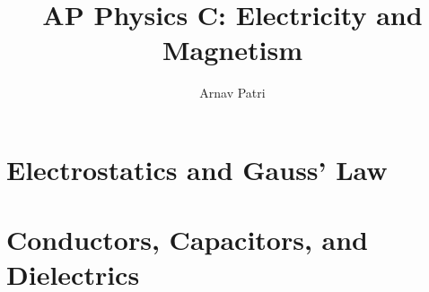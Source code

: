 \documentclass[A4, 12pt]{report}
\title{AP Physics C: Electricity and Magnetism}
\author{Arnav Patri}
\begin{document}
	\maketitle
	\chapter{Electrostatics and Gauss' Law}
		
	\chapter{Conductors, Capacitors, and Dielectrics}
		
\end{document}
